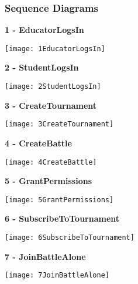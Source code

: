 \clearpage
\subsubsection{Sequence Diagrams}



\begin{minipage}{\textwidth}
\textbf{1 - EducatorLogsIn}
\begin{center}
	\texttt{[image: 1EducatorLogsIn]}
\end{center}
\end{minipage}

\begin{minipage}{\textwidth}
\textbf{2 - StudentLogsIn}
\begin{center}
	\texttt{[image: 2StudentLogsIn]}
\end{center}
\end{minipage}

\begin{minipage}{\textwidth}
	\textbf{3 - CreateTournament}
	\begin{center}
		\texttt{[image: 3CreateTournament]}
	\end{center}
\end{minipage}

\begin{minipage}{\textwidth}
	\textbf{4 - CreateBattle}
	\begin{center}
		\texttt{[image: 4CreateBattle]}
	\end{center}
\end{minipage}

\begin{minipage}{\textwidth}
	\textbf{5 - GrantPermissions}
	\begin{center}
		\texttt{[image: 5GrantPermissions]}
	\end{center}
\end{minipage}

\begin{minipage}{\textwidth}
	\textbf{6 - SubscribeToTournament}
	\begin{center}
		\texttt{[image: 6SubscribeToTournament]}
	\end{center}
\end{minipage}

\begin{minipage}{\textwidth}
	\textbf{7 - JoinBattleAlone}
	\begin{center}
		\texttt{[image: 7JoinBattleAlone]}
	\end{center}
\end{minipage}


